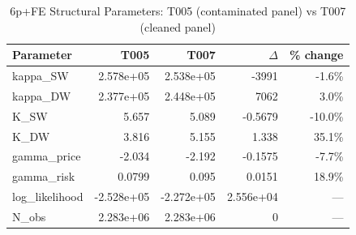 \begin{table}[htbp]
\centering
\caption{6p+FE Structural Parameters: T005 (contaminated panel) vs T007 (cleaned panel)}
\label{tab:theta_t005_t007}
\begin{tabular}{lrrrr}
\hline
Parameter & T005 & T007 & $\Delta$ & \% change \\
\hline
kappa_SW & 2.578e+05 & 2.538e+05 & -3991 & -1.6\% \\
kappa_DW & 2.377e+05 & 2.448e+05 & 7062 & 3.0\% \\
K_SW & 5.657 & 5.089 & -0.5679 & -10.0\% \\
K_DW & 3.816 & 5.155 & 1.338 & 35.1\% \\
gamma_price & -2.034 & -2.192 & -0.1575 & -7.7\% \\
gamma_risk & 0.0799 & 0.095 & 0.0151 & 18.9\% \\
log_likelihood & -2.528e+05 & -2.272e+05 & 2.556e+04 & --- \\
N_obs & 2.283e+06 & 2.283e+06 & 0 & --- \\
\hline
\end{tabular}
\end{table}
